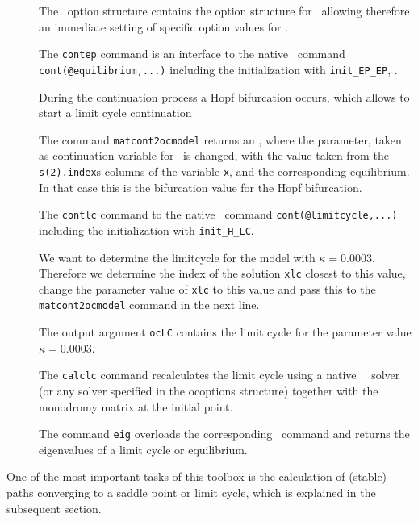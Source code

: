 \begin{description}
	\item[] The \OCT\ option structure contains the option structure for \MATCONT\ allowing therefore an immediate setting of specific option values for \MATCONT.
	\item[] The \lstinline+contep+ command is an interface to the native \MATCONT\ command \lstinline+cont(@equilibrium,...)+ including the initialization with \lstinline+init_EP_EP+, \citep[for details see][]{matcontmanual}.
	\item[] During the continuation process a Hopf bifurcation occurs, which allows to start a limit cycle continuation
	\item[] The command \lstinline+matcont2ocmodel+ returns an \ocmodel, where the parameter, taken as continuation variable for \MATCONT\ is changed, with the value taken from the \lstinline+s(2).index+s columns of the variable \lstinline+x+, and the corresponding equilibrium. In that case this is the bifurcation value for the Hopf bifurcation.
	\item[] The \lstinline+contlc+ command to the native \MATCONT\ command \lstinline+cont(@limitcycle,...)+ including the initialization with \lstinline+init_H_LC+.
	\item[] We want to determine the limitcycle for the model with $\kappa=0.0003$. Therefore we determine the index of the solution \lstinline+xlc+ closest to this value, change the parameter value of \lstinline+xlc+ to this value and pass this to the \lstinline+matcont2ocmodel+ command in the next line.
	\item[] The output argument \lstinline+ocLC+ contains the limit cycle for the parameter value $\kappa=0.0003$.
	\item[] The \lstinline+calclc+ command recalculates the limit cycle using a native \MATL\ \BVP\ solver (or any solver specified in the ocoptions structure) together with the monodromy matrix at the initial point.
	\item[] The command \lstinline+eig+ overloads the corresponding \MATL\ command and returns the eigenvalues of a limit cycle or equilibrium. 
\end{description}
One of the most important tasks of this toolbox is the calculation of (stable) paths converging to a saddle point or limit cycle, which is explained in the subsequent section.

